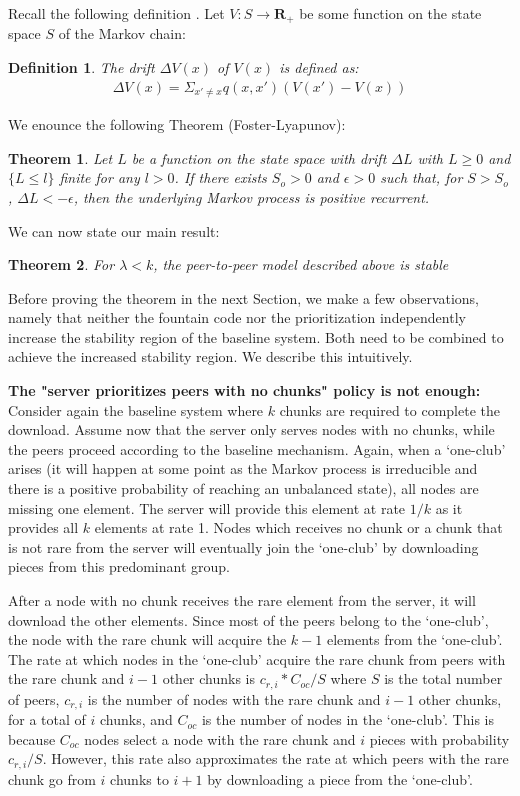 \documentclass[11pt,conference]{IEEEtran}
\newtheorem{theorem}{Theorem}[section]
\newcommand{\bTheorem}{ \begin{theorem}  }
\newcommand{\eTheorem}{ \end{theorem}    }
\newtheorem{Definition}{Definition}[section]
\newcommand{\bDef}{ \begin{Definition} }
\newcommand{\eDef}{ \end{Definition} }
\begin{document}
Recall the following definition
\cite{Foss2008Lyapunov}. Let $V:S \rightarrow \mathbf{R}_+$ be some function on the state space $S$ of the Markov chain:
\bDef
The drift $\Delta V(x)$ of $V(x)$ is defined as:
\begin{eqnarray} \Delta V(x) = \Sigma_{x' \neq x} q(x,x')(V(x')-V(x))
\end{eqnarray}
\eDef

We enounce the following Theorem (Foster-Lyapunov)\cite{Foss2008Lyapunov}:
\bTheorem
\label{theo:drift}
Let $L$ be a function on the state space with drift $\Delta L$ with $L \geq 0$ and $\{L \leq l\}$ finite for any $l>0$. If there exists $S_o > 0$ and $\epsilon > 0$ such that, for $S>S_o$, $\Delta L < - \epsilon$, then the underlying Markov process is positive recurrent.
\eTheorem

We can now state our main result:
\bTheorem
\label{theo:stable}
For $\lambda < k$, the peer-to-peer model described above is stable
\eTheorem

Before proving the theorem in the next Section, we make a few observations, namely that neither the fountain code nor the prioritization independently increase the stability region of the baseline system. Both need to be combined to achieve the increased stability region. We describe this intuitively.

{\bf The "server prioritizes peers with no chunks" policy is not enough:} Consider again the baseline system where $k$ chunks are required to complete the download. Assume now that the server only serves nodes with no chunks, while the peers proceed according to the baseline mechanism. Again, when a `one-club' arises (it will happen at some point as the Markov process is irreducible and there is a positive probability of reaching an unbalanced state), all  nodes are missing one element. The server will provide this element at rate $1/k$ as it provides all $k$ elements at rate 1. Nodes which receives no chunk or a chunk that is not rare from the server will eventually join the `one-club' by downloading pieces from this predominant group.

 After a node with no chunk receives the rare element from the server, it will download the other elements. Since most of the peers belong to the `one-club', the node with the rare chunk will acquire the $k-1$ elements from the `one-club'. The rate at which nodes in the `one-club' acquire the rare chunk from peers with the rare chunk and $i-1$ other chunks is $c_{r,i} * C_{oc}/S$ where $S$ is the total number of peers, $c_{r,i}$ is the number of nodes with the rare chunk and $i-1$ other chunks, for a total of $i$ chunks, and $C_{oc}$ is the number of nodes in the `one-club'. This is because $C_{oc}$ nodes select a node with the rare chunk and $i$ pieces with probability $c_{r,i}/S$. However, this rate also approximates the rate at which peers with the rare chunk go from $i$ chunks to $i+1$ by downloading a piece from the `one-club'.
\end{document}
